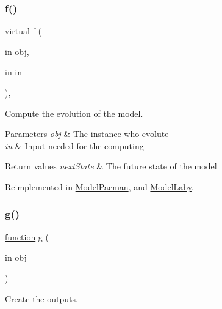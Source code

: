 \subsubsection{\texorpdfstring{f()}{f()}\hspace{0.1cm}{\footnotesize\ttfamily [2/2]}}
{\footnotesize\ttfamily virtual f (\begin{DoxyParamCaption}\item[{in}]{obj,  }\item[{in}]{in }\end{DoxyParamCaption})\hspace{0.3cm}{\ttfamily [virtual]}, {\ttfamily [inherited]}}



Compute the evolution of the model. 


\begin{DoxyParams}{Parameters}
{\em obj} & The instance who evolute \\
\hline
{\em in} & Input needed for the computing \\
\hline
\end{DoxyParams}

\begin{DoxyRetVals}{Return values}
{\em next\+State} & The future state of the model \\
\hline
\end{DoxyRetVals}


Reimplemented in \hyperlink{class_model_pacman_a6f3b146c92a207e95690d08975e1e072}{Model\+Pacman}, and \hyperlink{class_model_laby_a6f3b146c92a207e95690d08975e1e072}{Model\+Laby}.

\mbox{\label{class_stop_condition_a07dadfabe92bf9a144b8a862720e7746}} 
\subsubsection{\texorpdfstring{g()}{g()}}
{\footnotesize\ttfamily \hyperlink{_plan__desuma_functions_8m_ac2ffb26d6f42d3bbcd7847b0873403f4}{function} g (\begin{DoxyParamCaption}\item[{in}]{obj }\end{DoxyParamCaption})\hspace{0.3cm}{\ttfamily [virtual]}}



Create the outputs. 


